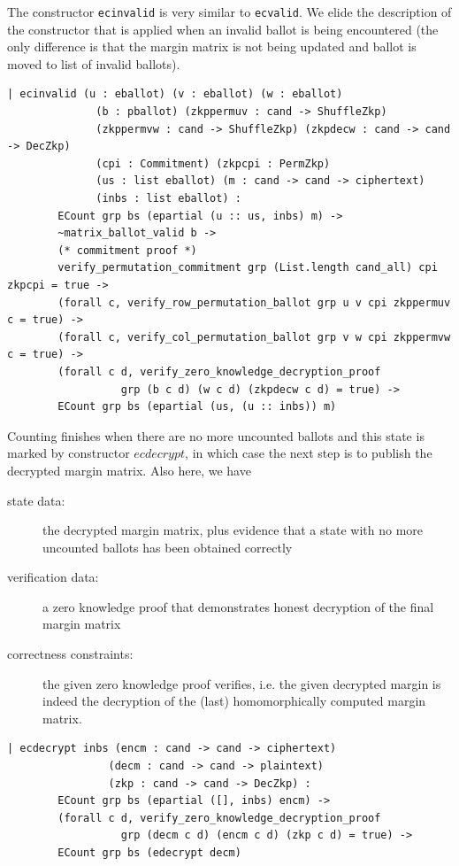   

The constructor \texttt{ecinvalid}  is very similar to \texttt{ecvalid}.  
We elide the description of the constructor that is applied
when an invalid ballot is being encountered (the only
difference is that the margin matrix is not being updated and ballot is moved to 
list of invalid ballots). 

\begin{lstlisting}[frame=single,basicstyle=\ttfamily\footnotesize]
  | ecinvalid (u : eballot) (v : eballot) (w : eballot)
              (b : pballot) (zkppermuv : cand -> ShuffleZkp)
              (zkppermvw : cand -> ShuffleZkp) (zkpdecw : cand -> cand -> DecZkp)
              (cpi : Commitment) (zkpcpi : PermZkp)
              (us : list eballot) (m : cand -> cand -> ciphertext)
              (inbs : list eballot) :
        ECount grp bs (epartial (u :: us, inbs) m) ->
        ~matrix_ballot_valid b ->
        (* commitment proof *)
        verify_permutation_commitment grp (List.length cand_all) cpi zkpcpi = true ->
        (forall c, verify_row_permutation_ballot grp u v cpi zkppermuv c = true) ->
        (forall c, verify_col_permutation_ballot grp v w cpi zkppermvw c = true) ->
        (forall c d, verify_zero_knowledge_decryption_proof 
                  grp (b c d) (w c d) (zkpdecw c d) = true) ->
        ECount grp bs (epartial (us, (u :: inbs)) m)
\end{lstlisting}

 

Counting finishes when there are no more uncounted ballots and this state is 
marked by constructor $ecdecrypt$, in
which case the next step is to publish the decrypted margin matrix.
Also here, we have
\begin{description}
  \item[state data:] the decrypted margin matrix, plus evidence
  that a state with no more uncounted ballots has been obtained
  correctly
  \item[verification data:] a zero knowledge proof that demonstrates
  honest decryption of the final margin matrix
  \item[correctness constraints:] the given zero knowledge proof
  verifies, i.e. the given decrypted margin is indeed the decryption
  of the (last) homomorphically computed margin matrix.
\end{description} 

 \begin{lstlisting}[frame=single,basicstyle=\ttfamily\footnotesize]
  | ecdecrypt inbs (encm : cand -> cand -> ciphertext)
                (decm : cand -> cand -> plaintext)
                (zkp : cand -> cand -> DecZkp) :
        ECount grp bs (epartial ([], inbs) encm) ->
        (forall c d, verify_zero_knowledge_decryption_proof
                  grp (decm c d) (encm c d) (zkp c d) = true) ->
        ECount grp bs (edecrypt decm)
 \end{lstlisting}
 
